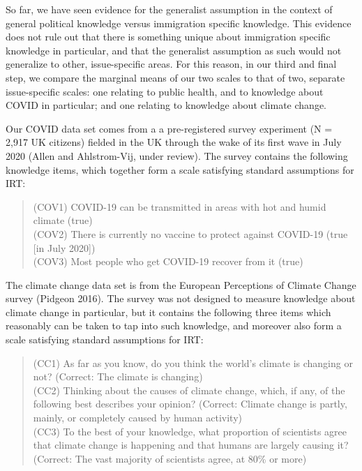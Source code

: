 \documentclass[12pt,halfline,a4paper,]{ouparticle}
\begin{document}
So far, we have seen evidence for the generalist assumption in the
context of general political knowledge versus immigration specific
knowledge. This evidence does not rule out that there is something
unique about immigration specific knowledge in particular, and that the
generalist assumption as such would not generalize to other,
issue-specific areas. For this reason, in our third and final step, we
compare the marginal means of our two scales to that of two, separate
issue-specific scales: one relating to public health, and to knowledge
about COVID in particular; and one relating to knowledge about climate
change.

Our COVID data set comes from a a pre-registered survey experiment (N =
2,917 UK citizens) fielded in the UK through the wake of its first wave
in July 2020 (Allen and Ahlstrom-Vij, under review). The survey contains
the following knowledge items, which together form a scale satisfying
standard assumptions for IRT:

\begin{quote}
(COV1) COVID-19 can be transmitted in areas with hot and humid climate
(true)\\
(COV2) There is currently no vaccine to protect against COVID-19 (true
{[}in July 2020{]})\\
(COV3) Most people who get COVID-19 recover from it (true)
\end{quote}

The climate change data set is from the European Perceptions of Climate
Change survey (Pidgeon 2016). The survey was not designed to measure
knowledge about climate change in particular, but it contains the
following three items which reasonably can be taken to tap into such
knowledge, and moreover also form a scale satisfying standard
assumptions for IRT:

\begin{quote}
(CC1) As far as you know, do you think the world's climate is changing
or not? (Correct: The climate is changing)\\
(CC2) Thinking about the causes of climate change, which, if any, of the
following best describes your opinion? (Correct: Climate change is
partly, mainly, or completely caused by human activity)\\
(CC3) To the best of your knowledge, what proportion of scientists agree
that climate change is happening and that humans are largely causing it?
(Correct: The vast majority of scientists agree, at 80\% or more)
\end{quote}
\end{document}
